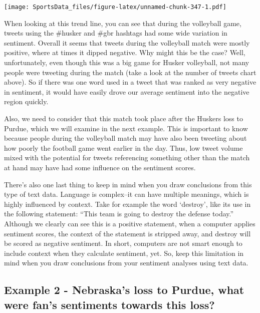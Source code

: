 \documentclass[
]{book}
\begin{document}
\texttt{[image: SportsData\_files/figure-latex/unnamed-chunk-347-1.pdf]}

When looking at this trend line, you can see that during the volleyball game, tweets using the \#husker and \#gbr hashtags had some wide variation in sentiment. Overall it seems that tweets during the volleyball match were mostly positive, where at times it dipped negative. Why might this be the case? Well, unfortunately, even though this was a big game for Husker volleyball, not many people were tweeting during the match (take a look at the number of tweets chart above). So if there was one word used in a tweet that was ranked as very negative in sentiment, it would have easily drove our average sentiment into the negative region quickly.

Also, we need to consider that this match took place after the Huskers loss to Purdue, which we will examine in the next example. This is important to know because people during the volleyball match may have also been tweeting about how poorly the football game went earlier in the day. Thus, low tweet volume mixed with the potential for tweets referencing something other than the match at hand may have had some influence on the sentiment scores.

There's also one last thing to keep in mind when you draw conclusions from this type of text data. Language is complex--it can have multiple meanings, which is highly influenced by context. Take for example the word `destroy', like its use in the following statement: ``This team is going to destroy the defense today.'' Although we clearly can see this is a positive statement, when a computer applies sentiment scores, the context of the statement is stripped away, and destroy will be scored as negative sentiment. In short, computers are not smart enough to include context when they calculate sentiment, yet. So, keep this limitation in mind when you draw conclusions from your sentiment analyses using text data.

\hypertarget{example-2---nebraskas-loss-to-purdue-what-were-fans-sentiments-towards-this-loss}{%
\subsection{Example 2 - Nebraska's loss to Purdue, what were fan's sentiments towards this loss?}\label{example-2---nebraskas-loss-to-purdue-what-were-fans-sentiments-towards-this-loss}}
\end{document}
